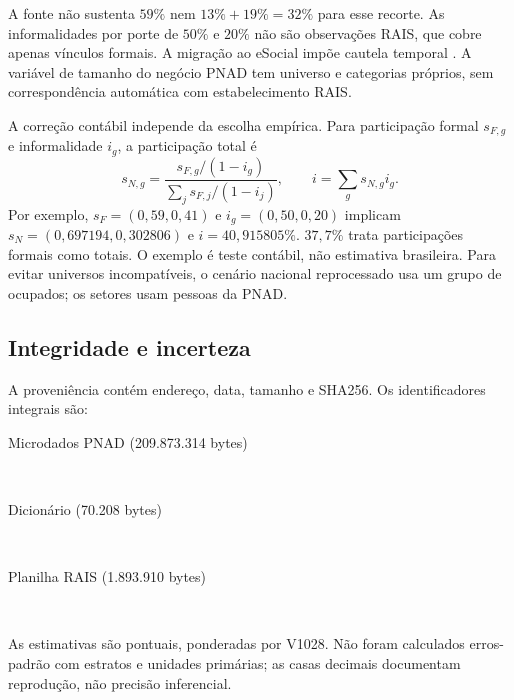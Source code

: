 A fonte não sustenta $59\%$ nem $13\%+19\%=32\%$ para esse recorte. As informalidades por porte de $50\%$ e $20\%$ não são observações RAIS, que cobre apenas vínculos formais. A migração ao eSocial impõe cautela temporal \citep{RAIS2022NotaTecnica}. A variável de tamanho do negócio PNAD tem universo e categorias próprios, sem correspondência automática com estabelecimento RAIS.

A correção contábil independe da escolha empírica. Para participação formal $s_{F,g}$ e informalidade $i_g$, a participação total é
\begin{equation}\label{eq:app_formal_total}
s_{N,g}=\frac{s_{F,g}/(1-i_g)}{\sum_j s_{F,j}/(1-i_j)},\qquad i=\sum_gs_{N,g}i_g.
\end{equation}
Por exemplo, $s_F=(0{,}59,0{,}41)$ e $i_g=(0{,}50,0{,}20)$ implicam $s_N=(0{,}697194,0{,}302806)$ e $i=40{,}915805\%$. $37{,}7\%$ trata participações formais como totais. O exemplo é teste contábil, não estimativa brasileira. Para evitar universos incompatíveis, o cenário nacional reprocessado usa um grupo de ocupados; os setores usam pessoas da PNAD.

\subsection{Integridade e incerteza}
A proveniência contém endereço, data, tamanho e SHA256. Os identificadores integrais são:
\begin{description}
\item[Microdados PNAD (209.873.314 bytes)]\hfill\\
{\normalsize{}}
\item[Dicionário (70.208 bytes)]\hfill\\
{\normalsize{}}
\item[Planilha RAIS (1.893.910 bytes)]\hfill\\
{\normalsize{}}
\end{description}
As estimativas são pontuais, ponderadas por V1028. Não foram calculados erros-padrão com estratos e unidades primárias; as casas decimais documentam reprodução, não precisão inferencial.
